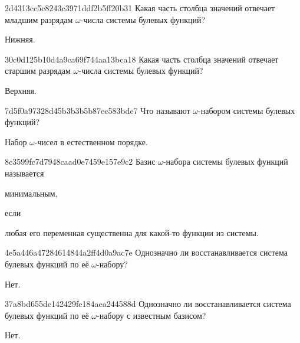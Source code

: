 \begin{note}{2d4313cc5c8243c3971ddf2b5ff20b31}
    Какая часть столбца значений отвечает младшим разрядам \({ \omega }\)-числа системы булевых функций?

    \begin{cloze}{1}
        Нижняя.
    \end{cloze}
\end{note}

\begin{note}{30c0d125b10d4a9ca69f744aa13bca18}
    Какая часть столбца значений отвечает старшим разрядам \({ \omega }\)-числа системы булевых функций?

    \begin{cloze}{1}
        Верхняя.
    \end{cloze}
\end{note}

\begin{note}{7d5f0a97328d45b3b3b5b87ec583bde7}
    Что называют \({ \omega }\)-набором системы булевых функций?

    \begin{cloze}{1}
        Набор \({ \omega }\)-чисел в естественном порядке.
    \end{cloze}
\end{note}

\begin{note}{8c3599fc7d7948caad0e7459e157e9c2}
    Базис \({ \omega }\)-набора системы булевых функций называется \begin{icloze}{2}минимальным,\end{icloze} если \begin{icloze}{1}любая его переменная существенна для какой-то функции из системы.\end{icloze}
\end{note}

\begin{note}{4e5a446a47284614844a2ff4d0a9ac7e}
    Однозначно ли восстанавливается система булевых функций по её \({ \omega }\)-набору?

    \begin{cloze}{1}
        Нет.
    \end{cloze}
\end{note}

\begin{note}{37a8bd655dc142429fe184aea244588d}
    Однозначно ли восстанавливается система булевых функций по её \({ \omega }\)-набору с известным базисом?

    \begin{cloze}{1}
        Нет.
    \end{cloze}
\end{note}

